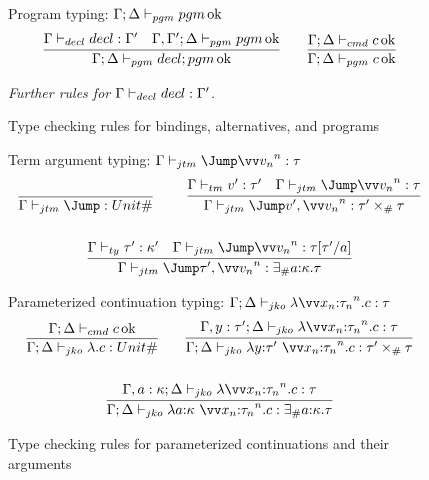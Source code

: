 \documentclass{article}
\begin{document}
\begin{figure}
Program typing: $\Gamma; \Delta \vdash_{pgm} pgm \operatorname{ok}$
\begin{gather*}
  \infer
  {\typepgm{\Gamma}{\Delta}{\decl; \pgm}}
  {
    \typedecl{\Gamma}{\decl}{\Gamma'}
    &
    \typepgm{\Gamma,\Gamma'}{\Delta}{\pgm}
  }
  \qquad
  \infer
  {\typepgm{\Gamma}{\Delta}{\cmd}}
  {\typecmd{\Gamma}{\Delta}{\cmd}}
\end{gather*}

\emph{Further rules for $\Gamma \vdash_{decl} decl : \Gamma'$.}
\caption{Type checking rules for bindings, alternatives, and programs}
\label{fig:typing-rules-binds}
\end{figure}

\begin{figure}
\centering

 Term argument typing: $\typejmptm{\Gamma}{\vect[n]{\tm_n}}{\ty}$
\begin{gather*}
  \axiom{\typejmptm{\Gamma}{}{\unitjmpty}}
  \qquad
  \infer
  {\typejmptm{\Gamma}{v', \vect[n]{\tm_n}}{\prodjmpty{\ty'}{\ty}}}
  {
    \typetm{\Gamma}{v'}{\ty'}
    &
    \typejmptm{\Gamma}{\vect[n]{\tm_n}}{\ty}
  }
  \\\\
  \infer
  {\typejmptm{\Gamma}{\ty', \vect[n]{\tm_n}}{\existjmpty{\ann a \ki}{\ty}}}
  {
    \typety{\Gamma}{\ty'}{\ki'}
    &
    \typejmptm{\Gamma}{\vect[n]{\tm_n}}{\ty\subst{a}{\ty'}}
  }
\end{gather*}

Parameterized continuation typing:
$\typejmpko{\Gamma}{\Delta}{\fnk{\vect[n]{\ann{x_n}{\ty_n}}}\cmd}{\ty}$
\begin{gather*}
  \infer
  {\typejmpko{\Gamma}{\Delta}{\fnk{}\cmd}{\unitjmpty}}
  {\typecmd{\Gamma}{\Delta}{\cmd}}
  \qquad
  \infer
  {
    \typejmpko
    {\Gamma}{\Delta}
    {\fnk{\ann{y}{\ty'}~\vect[n]{\ann{x_n}{\ty_n}}}\cmd}
    {\prodjmpty{\ty'}{\ty}}
  }
  {
    \typejmpko
    {\Gamma, y:\ty'}{\Delta}
    {\fnk{\vect[n]{\ann{x_n}{\ty_n}}}\cmd}
    {\ty}
  }
  \\\\
  \infer
  {
    \typejmpko
    {\Gamma}{\Delta}
    {\fnk{\ann{a}{\ki}~\vect[n]{\ann{x_n}{\ty_n}}}\cmd}
    {\existjmpty{\ann{a}{\ki}}\ty}
  }
  {
    \typejmpko
    {\Gamma, a:\ki}{\Delta}
    {\fnk{\vect[n]{\ann{x_n}{\ty_n}}}\cmd}
    {\ty}
  }
\end{gather*}

\caption{Type checking rules for parameterized continuations and their arguments}
\label{fig:typing-rules-jumps}
\end{figure}
\end{document}
